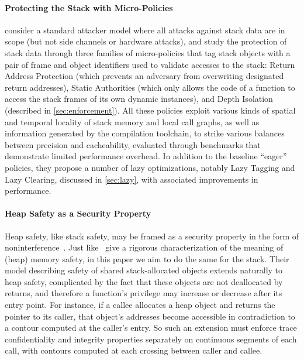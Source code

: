 \documentclass[acmsmall,review,anonymous]{acmart}\settopmatter{printfolios=true,printccs=false,printacmref=false}
\begin{document}
{\paragraph{Protecting the Stack with Micro-Policies}
%
\citet{DBLP:conf/sp/RoesslerD18} consider a standard attacker model where all
attacks against stack data are in scope (but not side channels or hardware
attacks), and study the protection of stack data through three families of
micro-policies that tag stack objects with a pair of frame and object identifiers
used to validate accesses to the stack: Return Address Protection (which
prevents an adversary from overwriting designated return addresses), Static
Authorities (which only allows the code of a function to access the stack frames
of its own dynamic instances), and Depth Isolation (described in
\cref{sec:enforcement}). All these policies exploit various kinds of spatial and
temporal locality of stack memory and local call graphs, as well as information
generated by the compilation toolchain, to strike various balances between
precision and cacheability, evaluated through benchmarks that demonstrate
limited performance overhead. In addition to the baseline ``eager'' policies,
they propose a number of lazy optimizations, notably Lazy Tagging and Lazy
Clearing, discussed in \cref{sec:lazy}, with associated improvements in
performance.

\paragraph{Heap Safety as a Security Property}

Heap safety, like stack safety, may be framed as a security property
in the form of noninterference~\citep{DBLP:conf/post/AmorimHP18}. Just
like~\citeauthor{DBLP:conf/post/AmorimHP18} give a rigorous
characterization of the meaning of (heap) memory safety, in this paper
we aim to do the same for the stack.
%
Their model describing safety of shared stack-allocated
objects extends naturally to heap safety, complicated by the fact that
these objects are not deallocated by returns, and therefore a
function's privilege may increase or decrease after its entry
point. For instance, if a callee allocates a heap object and returns
the pointer to its caller, that object's addresses become accessible
in contradiction to a contour computed at the caller's entry. So such
an extension must enforce trace confidentiality and integrity
properties separately on continuous segments of each call, with
contours computed at each crossing between caller and callee.

}
\end{document}
